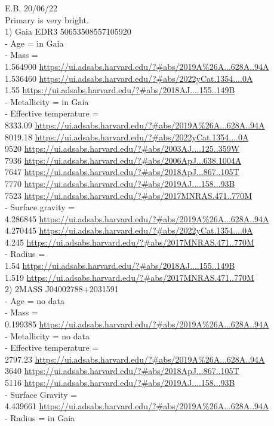 E.B. 20/06/22\\
Primary is very bright.\\

1) Gaia EDR3 50653508557105920\\
- Age = in Gaia\\
- Mass = \\
1.564900 \url{https://ui.adsabs.harvard.edu/?#abs/2019A%26A...628A..94A}\\
1.536460 \url{https://ui.adsabs.harvard.edu/?#abs/2022yCat.1354....0A}\\
1.55 \url{https://ui.adsabs.harvard.edu/?#abs/2018AJ....155..149B}\\
- Metallicity = in Gaia\\
- Effective temperature = \\
8333.09 \url{https://ui.adsabs.harvard.edu/?#abs/2019A%26A...628A..94A}\\
8019.18 \url{https://ui.adsabs.harvard.edu/?#abs/2022yCat.1354....0A}\\
9520 \url{https://ui.adsabs.harvard.edu/?#abs/2003AJ....125..359W}\\
7936 \url{https://ui.adsabs.harvard.edu/?#abs/2006ApJ...638.1004A}\\
7647 \url{https://ui.adsabs.harvard.edu/?#abs/2018ApJ...867..105T}\\
7770 \url{https://ui.adsabs.harvard.edu/?#abs/2019AJ....158...93B}\\
7523 \url{https://ui.adsabs.harvard.edu/?#abs/2017MNRAS.471..770M}\\
- Surface gravity = \\
4.286845 \url{https://ui.adsabs.harvard.edu/?#abs/2019A%26A...628A..94A}\\
4.270445 \url{https://ui.adsabs.harvard.edu/?#abs/2022yCat.1354....0A}\\
4.245 \url{https://ui.adsabs.harvard.edu/?#abs/2017MNRAS.471..770M}\\
- Radius = \\
1.54 \url{https://ui.adsabs.harvard.edu/?#abs/2018AJ....155..149B}\\
1.519 \url{https://ui.adsabs.harvard.edu/?#abs/2017MNRAS.471..770M}\\

2) 2MASS J04002788+2031591\\
- Age = no data\\
- Mass =\\
0.199385 \url{https://ui.adsabs.harvard.edu/?#abs/2019A%26A...628A..94A}\\
- Metallicity = no data\\ 
- Effective temperature =\\
2797.23 \url{https://ui.adsabs.harvard.edu/?#abs/2019A%26A...628A..94A}\\
3640 \url{https://ui.adsabs.harvard.edu/?#abs/2018ApJ...867..105T}\\
5116 \url{https://ui.adsabs.harvard.edu/?#abs/2019AJ....158...93B}\\
- Surface Gravity =\\
4.439661 \url{https://ui.adsabs.harvard.edu/?#abs/2019A%26A...628A..94A}\\
- Radius = in Gaia